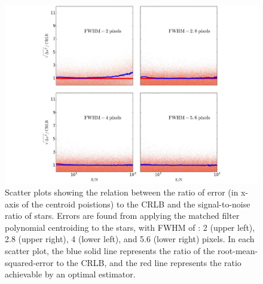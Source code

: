 \begin{figure}[p]~\\
\begin{center}
 \includegraphics[width=\linewidth]{figures/centroiding/new_matchedfilter.pdf}
 \caption{
 Scatter plots showing the relation between the ratio of error (in x-axis of the centroid poistions) to the CRLB and the signal-to-noise ratio of stars. 
Errors are found from applying the matched filter polynomial centroiding to the stars,
with FWHM of : 2 (upper left), 2.8 (upper right), 4 (lower left), and 5.6 (lower right) pixels. In each scatter plot, the blue solid line represents the ratio of the root-mean-squared-error to the CRLB, and the red line represents the ratio achievable by an optimal estimator.}\label{2}
\end{center}
\end{figure}

